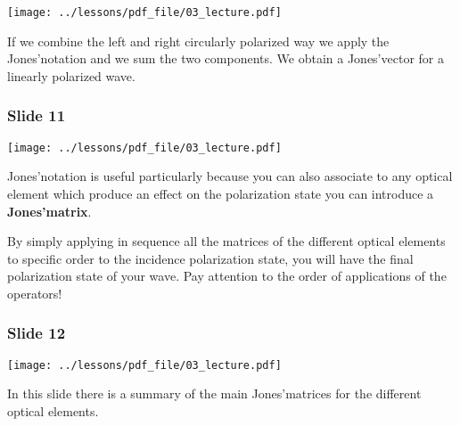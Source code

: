 \documentclass[../main/main.tex]{subfiles}
\begin{document}
\begin{minipage}[]{0.5\linewidth}
\centering
\texttt{[image: ../lessons/pdf\_file/03\_lecture.pdf]}
\end{minipage}
\hspace{0.3cm}\vspace{0.3cm}
\begin{minipage}[c]{0.47\linewidth}
If we combine the left and right circularly polarized way we apply the Jones'notation and we sum the two components. We obtain a Jones'vector for a linearly polarized wave.

\end{minipage}

\subsubsection*{Slide 11}

\begin{minipage}[]{0.5\linewidth}
\centering
\texttt{[image: ../lessons/pdf\_file/03\_lecture.pdf]}
\end{minipage}
\hspace{0.3cm}\vspace{0.3cm}
\begin{minipage}[c]{0.47\linewidth}

Jones'notation is useful particularly because you can also associate to any optical element which produce an effect on the polarization state you can introduce a \textbf{Jones'matrix}.

By simply applying in sequence all the matrices of the different optical elements to specific order to the incidence polarization state, you will have the final polarization state of your wave. Pay attention to the order of applications of the operators!

\end{minipage}

\subsubsection*{Slide 12}

\begin{minipage}[]{0.5\linewidth}
\centering
\texttt{[image: ../lessons/pdf\_file/03\_lecture.pdf]}
\end{minipage}
\hspace{0.3cm}\vspace{0.3cm}
\begin{minipage}[c]{0.47\linewidth}

In this slide there is a summary of the main Jones'matrices for the different optical elements.


\end{minipage}
\end{document}
